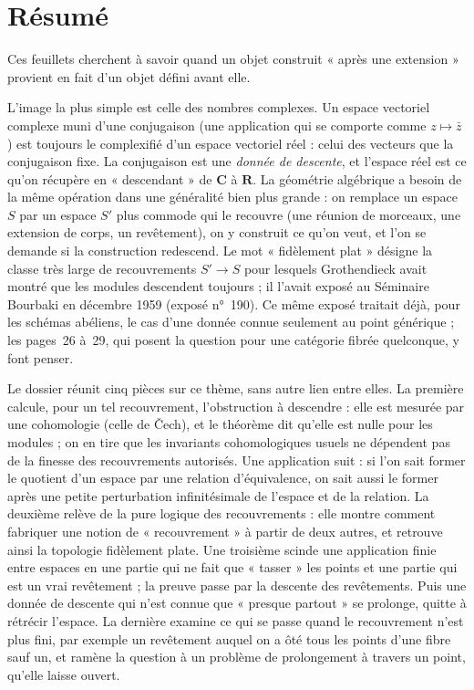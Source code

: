 \documentclass[11pt,a4paper]{article}
\begin{document}
\section*{Résumé}

\begin{resume}
Ces feuillets cherchent à savoir quand un objet construit « après une
extension » provient en fait d'un objet défini avant elle.

L'image la plus simple est celle des nombres complexes. Un espace vectoriel
complexe muni d'une conjugaison (une application qui se comporte comme
$z \mapsto \bar z$) est toujours le complexifié d'un espace vectoriel réel :
celui des vecteurs que la conjugaison fixe. La conjugaison est une \emph{donnée
de descente}, et l'espace réel est ce qu'on récupère en « descendant » de
$\mathbf{C}$ à $\mathbf{R}$. La géométrie algébrique a besoin de la même
opération dans une généralité bien plus grande : on remplace un espace $S$ par
un espace $S'$ plus commode qui le recouvre (une réunion de morceaux, une
extension de corps, un revêtement), on y construit ce qu'on veut, et l'on se
demande si la construction redescend. Le mot « fidèlement plat » désigne la
classe très large de recouvrements $S' \to S$ pour lesquels Grothendieck avait
montré que les modules descendent toujours ; il l'avait exposé au Séminaire
Bourbaki en décembre 1959 (exposé n°~190). Ce même exposé traitait déjà, pour
les schémas abéliens, le cas d'une donnée connue seulement au point générique ;
les pages~26 à~29, qui posent la question pour une catégorie fibrée
quelconque, y font penser.

Le dossier réunit cinq pièces sur ce thème, sans autre lien entre elles.
La première calcule, pour un tel recouvrement, l'obstruction à descendre : elle
est mesurée par une cohomologie (celle de Čech), et le théorème dit qu'elle
est nulle pour les modules ; on en tire que les invariants cohomologiques
usuels ne dépendent pas de la finesse des recouvrements autorisés. Une
application suit : si l'on sait former le quotient d'un espace par une
relation d'équivalence, on sait aussi le former après une petite perturbation
infinitésimale de l'espace et de la relation. La deuxième relève de la pure
logique des recouvrements : elle montre comment fabriquer une notion de
« recouvrement » à partir de deux autres, et retrouve ainsi la topologie
fidèlement plate. Une troisième scinde une application finie entre espaces
en une partie qui ne fait que « tasser » les points et une partie qui est un
vrai revêtement ; la preuve passe par la descente des revêtements. Puis une donnée de descente qui n'est connue que « presque partout »
se prolonge, quitte à rétrécir l'espace. La dernière examine ce qui se
passe quand le recouvrement n'est plus fini, par exemple un revêtement auquel
on a ôté tous les points d'une fibre sauf un, et ramène la question à un problème de
prolongement à travers un point, qu'elle laisse ouvert.


\end{resume}
\end{document}
